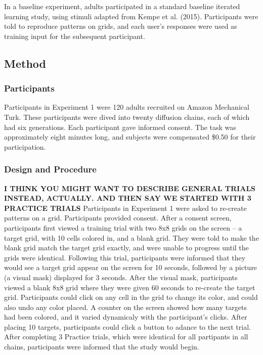 \documentclass[10pt, letterpaper]{article}
\begin{document}
In a baseline experiment, adults participated in a standard baseline
iterated learning study, using stimuli adapted from Kempe et al. (2015).
Participants were told to reproduce patterns on grids, and each user's
responses were used as training input for the subsequent participant.

\subsection{Method}\label{method}

\subsubsection{Participants}\label{participants}

Participants in Experiment 1 were 120 adults recruited on Amazon
Mechanical Turk. These participants were dived into twenty diffusion
chains, each of which had six generations. Each participant gave
informed consent. The task was approximately eight minutes long, and
subjects were compensated \$0.50 for their participation.

\subsubsection{Design and Procedure}\label{design-and-procedure}

\textbf{I THINK YOU MIGHT WANT TO DESCRIBE GENERAL TRIALS INSTEAD,
ACTUALLY. AND THEN SAY WE STARTED WITH 3 PRACTICE TRIALS} Participants
in Experiment 1 were asked to re-create patterns on a grid. Participants
provided consent. After a consent screen, participants first viewed a
training trial with two 8x8 grids on the screen -- a target grid, with
10 cells colored in, and a blank grid. They were told to make the blank
grid match the target grid exactly, and were unable to progress until
the grids were identical. Following this trial, participants were
informed that they would see a target grid appear on the screen for 10
seconds, followed by a picture (a visual mask) displayed for 3 seconds.
After the visual mask, participants viewed a blank 8x8 grid where they
were given 60 seconds to re-create the target grid. Participants could
click on any cell in the grid to change its color, and could also undo
any color placed. A counter on the screen showed how many targets had
been colored, and it varied dynamicaly with the participant's clicks.
After placing 10 targets, participants could click a button to adance to
the next trial. After completing 3 Practice trials, which were identical
for all partipants in all chains, participants were informed that the
study would begin.
\end{document}
